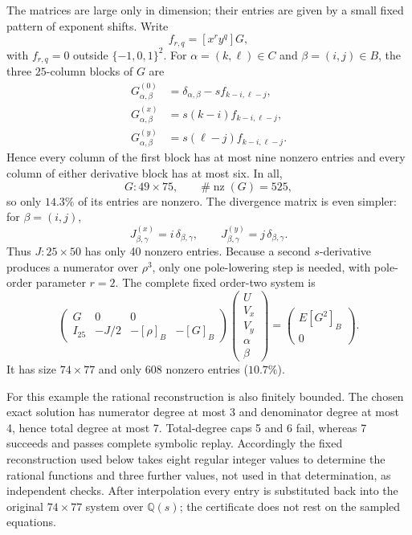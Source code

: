 \documentclass[11pt,fleqn]{article}
\theoremstyle{plain}
\begin{document}
The matrices are large only in dimension; their entries are given by a small
fixed pattern of exponent shifts.  Write
\[
 f_{r,q}=[x^ry^q]G,
\]
with \(f_{r,q}=0\) outside \(\{-1,0,1\}^2\).  For
\(\alpha=(k,\ell)\in C\) and \(\beta=(i,j)\in B\), the three \(25\)-column
blocks of \(G\) are
\begin{equation}\label{eq:G-entries}
\begin{aligned}
 G^{(0)}_{\alpha,\beta}
   &=\delta_{\alpha,\beta}-s f_{k-i,\ell-j},\\
 G^{(x)}_{\alpha,\beta}
   &=s(k-i)f_{k-i,\ell-j},\\
 G^{(y)}_{\alpha,\beta}
   &=s(\ell-j)f_{k-i,\ell-j}.
\end{aligned}
\end{equation}
Hence every column of the first block has at most nine nonzero entries and
every column of either derivative block has at most six.  In all,
\[
 G:49\times75,\qquad \#\operatorname{nz}(G)=525,
\]
so only \(14.3\%\) of its entries are nonzero.  The divergence matrix is even
simpler: for \(\beta=(i,j)\),
\begin{equation}\label{eq:J-entries}
 J^{(x)}_{\beta,\gamma}=i\,\delta_{\beta,\gamma},
 \qquad
 J^{(y)}_{\beta,\gamma}=j\,\delta_{\beta,\gamma}.
\end{equation}
Thus \(J:25\times50\) has only 40 nonzero entries.  Because a second
\(s\)-derivative produces a numerator over \(\rho^3\), only one pole-lowering
step is needed, with pole-order parameter \(r=2\).  The complete fixed
order-two system is
\[
 \begin{pmatrix}
   G&0&0\\
   I_{25}&-J/2&-[\rho]_B&-[G]_B
 \end{pmatrix}
 \begin{pmatrix}U\\V_x\\V_y\\\alpha\\\beta\end{pmatrix}
 =
 \begin{pmatrix}E[G^2]_B\\0\end{pmatrix}.
\]
It has size \(74\times77\) and only 608 nonzero entries (\(10.7\%\)).

For this example the rational reconstruction is also finitely bounded.  The
chosen exact solution has numerator degree at most 3 and denominator degree at
most 4, hence total degree at most 7.  Total-degree caps 5 and 6 fail, whereas
7 succeeds and passes complete symbolic replay.  Accordingly the fixed
reconstruction used below takes eight regular integer values to determine the
rational functions and three further values, not used in that determination,
as independent checks.  After interpolation every
entry is substituted back into the original \(74\times77\) system over
\(\mathbb Q(s)\); the certificate does not rest on the sampled equations.
\end{document}
